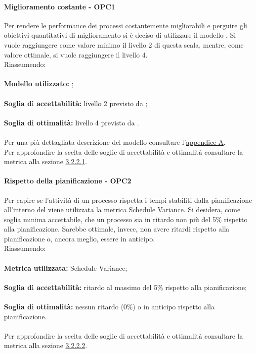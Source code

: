 \documentclass[PianoDiQualifica.tex]{subfiles}
\begin{document}
			\paragraph{Miglioramento costante - OPC1}
			Per rendere le performance dei processi costantemente migliorabili e perguire gli obiettivi quantitativi di miglioramento si è deciso di utilizzare il modello .
			Si vuole raggiungere come valore minimo il livello 2 di questa scala, mentre, come valore ottimale, si vuole raggiungere il livello 4. \\
			Riassumendo: \\ \\
			\textbf{Modello utilizzato:} ; \\ \\
			\textbf{Soglia di accettabilità:} livello 2 previsto da ; \\ \\
			\textbf{Soglia di ottimalità:} livello 4 previsto da . \\ \\
			Per una più dettagliata descrizione del modello  consultare l'\hyperlink{CMM_label}{appendice A}. \\
			Per approfondire la scelta delle soglie di accettabilità e ottimalità consultare la metrica alla sezione \hyperlink{CMM_m}{3.2.2.1}.	
			
			\paragraph{Rispetto della pianificazione - OPC2}
			Per capire se l'attività di un processo rispetta i tempi stabiliti dalla pianificazione all'interno del \PPdocRR{} viene utilizzata la metrica Schedule Variance.
			Si desidera, come soglia minima accettabile, che un processo sia in ritardo non più del 5\% rispetto alla pianificazione. Sarebbe ottimale, invece, non avere ritardi
			rispetto alla pianificazione o, ancora meglio, essere in anticipo.\\
			Riassumendo: \\ \\
			\textbf{Metrica utilizzata:} Schedule Variance; \\ \\
			\textbf{Soglia di accettabilità:} ritardo al massimo del 5\% rispetto alla pianificazione; \\ \\
			\textbf{Soglia di ottimalità:} nessun ritardo (0\%) o in anticipo rispetto alla pianificazione. \\ \\
			Per approfondire la scelta delle soglie di accettabilità e ottimalità consultare la metrica alla sezione \hyperlink{Schedule_m}{3.2.2.2}.	
			
\end{document}
